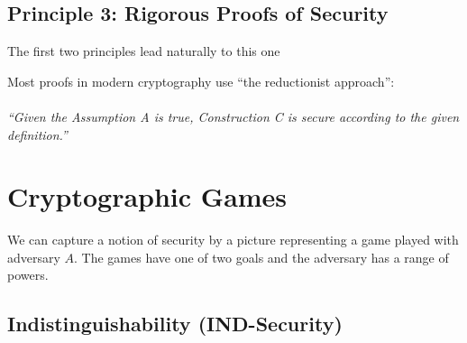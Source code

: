 \subsection{Principle 3: Rigorous Proofs of Security}

The first two principles lead naturally to this one

Most proofs in modern cryptography use ``the reductionist approach'':\\\\
    \textit{``Given the Assumption A is true, Construction C is secure according to the given definition.''}

\section{Cryptographic Games}

We can capture a notion of security by a picture representing a game played with adversary $A$. The games have one of two goals and the adversary has a range of powers.

\subsection{Indistinguishability (IND-Security)}

